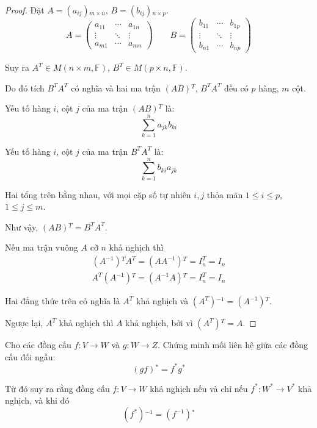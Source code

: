 \documentclass[class=linearalgebra,crop=false]{standalone}
\begin{document}
\begin{proof}
    Đặt $A = (a_{ij}){}_{m\times n}$, $B = (b_{ij}){}_{n\times p}$.
    \[
        A =
        \begin{pmatrix}
            a_{11} & \cdots & a_{1n} \\
            \vdots & \ddots & \vdots \\
            a_{m1} & \cdots & a_{mn}
        \end{pmatrix}
        \qquad
        B =
        \begin{pmatrix}
            b_{11} & \cdots & b_{1p} \\
            \vdots & \ddots & \vdots \\
            b_{n1} & \cdots & b_{np}
        \end{pmatrix}
    \]
    \par Suy ra $A^{T}\in M(n\times m, \mathbb{F})$, $B^{T}\in M(p\times n, \mathbb{F})$.
    \par Do đó tích $B^{T}A^{T}$ có nghĩa và hai ma trận $(AB){}^{T}$, $B^{T}A^{T}$ đều có $p$ hàng, $m$ cột.
    \par Yếu tố hàng $i$, cột $j$ của ma trận $(AB){}^{T}$ là:
    \[
        \sum^{n}_{k=1}a_{jk}b_{ki}
    \]
    \par Yếu tố hàng $i$, cột $j$ của ma trận $B^{T}A^{T}$ là:
    \[
        \sum^{n}_{k=1}b_{ki}a_{jk}
    \]
    \par Hai tổng trên bằng nhau, với mọi cặp số tự nhiên $i, j$ thỏa mãn $1\le i\le p$, $1\le j\le m$.
    \par Như vậy, $(AB){}^{T} = B^{T}A^{T}$.
    \bigskip
    \par Nếu ma trận vuông $A$ cỡ $n$ khả nghịch thì
    \[
        \begin{split}
            (A^{-1}){}^{T}A^{T} = (AA^{-1}){}^{T} = I_{n}^{T} = I_{n} \\
            A^{T}(A^{-1}){}^{T} = (A^{-1}A){}^{T} = I_{n}^{T} = I_{n}
        \end{split}
    \]
    \par Hai đẳng thức trên có nghĩa là $A^{T}$ khả nghịch và $(A^{T}){}^{-1} = (A^{-1}){}^{T}$.
    \par Ngược lại, $A^{T}$ khả nghịch thì $A$ khả nghịch, bởi vì $(A^{T}){}^{T} = A$.
\end{proof}

\begin{exercise}
    Cho các đồng cấu $f: V\to W$ và $g: W\to Z$. Chứng minh mối liên hệ giữa các đồng cấu đối ngẫu:
    \[
        (gf){}^{*} = f^{*}g^{*}
    \]
    \par Từ đó suy ra rằng đồng cấu $f: V\to W$ khả nghịch nếu và chỉ nếu $f^{*}: W^{*}\to V^{*}$ khả nghịch, và khi đó
    \[
        (f^{*}){}^{-1} = (f^{-1}){}^{*}
    \]
\end{exercise}
\end{document}
